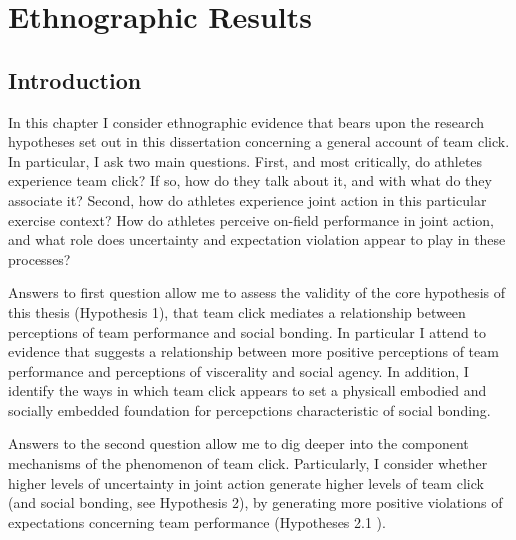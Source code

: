 
\begin{savequote}[8cm]

  \qauthor{}
\end{savequote}



\chapter{Ethnographic Results\label{chap:ethnoResults}}

\minitoc






                                      \begin{CJK}{UTF8}{gbsn}


\section{Introduction}

In this chapter I consider ethnographic evidence that bears upon the research hypotheses set out in this dissertation concerning a general account of team click.  In particular, I ask two main questions.  First, and most critically, do athletes experience team click? If so, how do they talk about it, and with what do they associate it?  Second, how do athletes experience joint action in this particular exercise context?  How do athletes perceive on-field performance in joint action, and what role does uncertainty and expectation violation appear to play in these processes?

Answers to first question allow me to assess the validity of the core hypothesis of this thesis (Hypothesis 1), that team click mediates a relationship between perceptions of team performance and social bonding. In particular I attend to evidence that suggests a relationship between more positive perceptions of team performance and perceptions of viscerality and social agency. In addition, I identify the ways in which team click appears to set a physicall embodied and socially embedded foundation for percepctions characteristic of social bonding.

Answers to the second question allow me to dig deeper into the component mechanisms of the phenomenon of team click.  Particularly, I consider whether higher levels of uncertainty in joint action generate higher levels of team click (and social bonding, see Hypothesis 2), by generating more positive violations of expectations concerning team performance (Hypotheses 2.1 ).


\end{CJK}

